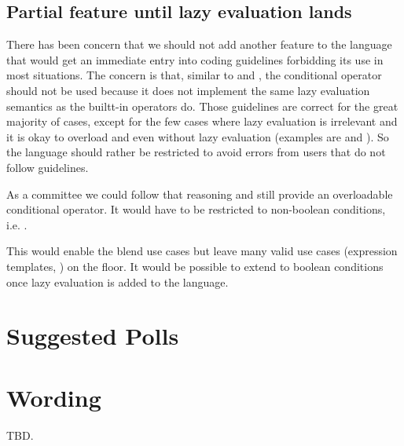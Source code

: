 \subsection{Partial feature until lazy evaluation lands}
There has been concern that we should not add another feature to the language that would get an immediate entry into coding guidelines forbidding its use in most situations.
The concern is that, similar to  and , the conditional operator should not be used because it does not implement the same lazy evaluation semantics as the builtt-in operators do.
Those guidelines are correct for the great majority of cases, except for the few cases where lazy evaluation is irrelevant and it is okay to overload \code{\&\&} and \code{||} even without lazy evaluation (examples are  and ).
So the language should rather be restricted to avoid errors from users that do not follow guidelines.

As a committee we could follow that reasoning and still provide an overloadable conditional operator.
It would have to be restricted to non-boolean conditions, i.e. .

This would enable the blend use cases but leave many valid use cases (expression templates, ) on the floor.
It would be possible to extend  to boolean conditions once lazy evaluation is added to the language.

\section{Suggested Polls}






\section{Wording}
TBD.





